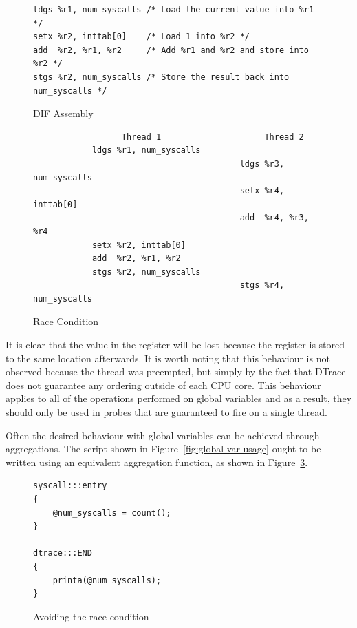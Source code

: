 \begin{figure}
\begin{lstlisting}
ldgs %r1, num_syscalls /* Load the current value into %r1 */
setx %r2, inttab[0]    /* Load 1 into %r2 */
add  %r2, %r1, %r2     /* Add %r1 and %r2 and store into %r2 */
stgs %r2, num_syscalls /* Store the result back into num_syscalls */
\end{lstlisting}
\caption{DIF Assembly}
  \label{fig:dif-asm}
\end{figure}

\begin{figure}
  \begin{lstlisting}
                  Thread 1                     Thread 2
            ldgs %r1, num_syscalls
                                          ldgs %r3, num_syscalls
                                          setx %r4, inttab[0]
                                          add  %r4, %r3, %r4
            setx %r2, inttab[0]
            add  %r2, %r1, %r2
            stgs %r2, num_syscalls
                                          stgs %r4, num_syscalls
  \end{lstlisting}
  \caption{Race Condition}
  \label{fig:race}
\end{figure}

\noindent
It is clear that the value in the  register will be lost because
the register  is stored to the same location afterwards. It is
worth noting that this behaviour is not observed because the thread was
preempted, but simply by the fact that DTrace does not guarantee any ordering
outside of each CPU core. This behaviour applies to all of the operations
performed on global variables and as a result, they should only be used in
probes that are guaranteed to fire on a single thread. \newline

\noindent
Often the desired behaviour with global variables can be achieved through
aggregations. The script shown in Figure~\ref{fig:global-var-usage} ought to be
written using an equivalent aggregation function, as shown in
Figure~\ref{fig:avoiding-the-race}.

\begin{figure}
  \begin{lstlisting}
syscall:::entry
{
    @num_syscalls = count();
}

dtrace:::END
{
    printa(@num_syscalls);
}
  \end{lstlisting}
  \caption{Avoiding the race condition}
  \label{fig:avoiding-the-race}
\end{figure}
